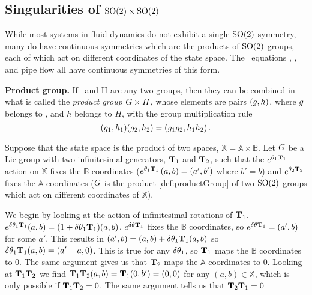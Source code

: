 {\subsection{Singularities of $\textrm{SO}(2) \times \textrm{SO}(2)$}

While most systems in fluid dynamics do not exhibit a single $\textrm{SO}(2)$ symmetry, many do have continuous symmetries which are the products of $\textrm{SO}(2)$ groups, each of which act on different coordinates of the state space. The \KS\ equations , {\pCf} , and pipe flow  all have continuous symmetries of this form.

\begin{definition}
\label{def:productGroup}
\textbf{Product group.}
If \Group\ and H are any two groups, then they can be combined in
what is called the {\em product group} $G \times H$, whose
elements are pairs $(g,h)$, where $g$ belongs to \Group, and
$h$ belongs to $H$, with the group multiplication rule
\[
(g_1,h_1)(g_2,h_2)=(g_1 g_2,h_1 h_2)
\,.
\]
\end{definition}

Suppose that the state space is the product of two spaces, $\mathbb{X}=\mathbb{A} \times \mathbb{B}$.
Let $G$ be a Lie group with two infinitesimal generators, $\mathbf{T}_1$ and $\mathbf{T}_2$, such that the $e^{{\bf \theta}_1 \mathbf{T}_1}$ action on $\mathbb{X}$ fixes the $\mathbb{B}$ coordinates ($e^{{\bf \theta}_1 \mathbf{T}_1} \, (a,b)=(a',b')$ where $b'=b$) and $e^{{\bf \theta}_2 \mathbf{T}_2}$ fixes the $\mathbb{A}$ coordinates ($G$ is the product \ref{def:productGroup} of two $\textrm{SO}(2)$ groups which act on different coordinates of $\mathbb{X}$).

We begin by looking at the action of infinitesimal rotations of $\mathbf{T}_1$. $e^{\delta {\bf \theta}_1 \mathbf{T}_1}(a,b)=(1+\delta {\bf \theta}_1 \mathbf{T}_1) (a,b)$. $e^{\delta {\bf \theta} \mathbf{T}_1}$ fixes the $\mathbb{B}$ coordinates, so $e^{\delta {\bf \theta} \mathbf{T}_1}=(a',b)$ for some $a'$. This results in $(a',b)=(a,b)+\delta {\bf \theta}_1 \mathbf{T}_1(a,b)$ so $\delta {\bf \theta}_1 \mathbf{T}_1(a,b)=(a'-a,0)$. This is true for any $\delta {\bf \theta}_1$, so $\mathbf{T}_1$ maps the $\mathbb{B}$ coordinates to 0. The same argument gives us that $\mathbf{T}_2$ maps the $\mathbb{A}$ coordinates to 0. Looking at $\mathbf{T}_1 \mathbf{T}_2$ we find $\mathbf{T}_1 \mathbf{T}_2 (a,b)=\mathbf{T}_1 (0,b')=(0,0)$ for any $(a,b) \in \mathbb{X}$, which is only possible if $\mathbf{T}_1 \mathbf{T}_2=0$. The same argument tells us that $\mathbf{T}_2 \mathbf{T}_1=0$ %

}
